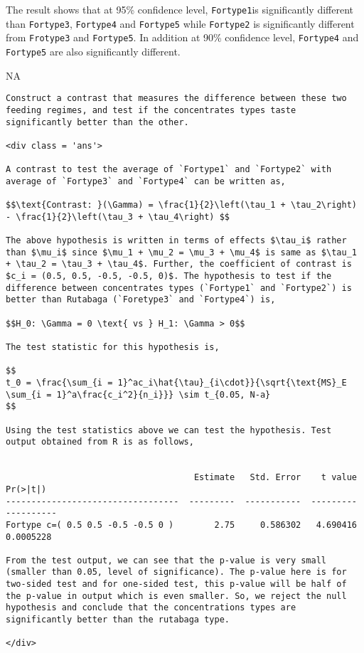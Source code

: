 \documentclass[11pt,a4paper]{article}
\begin{document}
\begin{enumerate}
  The result shows that at 95\% confidence level, \texttt{Fortype1}is
  significantly different than \texttt{Fortype3}, \texttt{Fortype4} and
  \texttt{Fortype5} while \texttt{Fortype2} is significantly different
  from \texttt{Frotype3} and \texttt{Fortype5}. In addition at 90\%
  confidence level, \texttt{Fortype4} and \texttt{Fortype5} are also
  significantly different.
\end{enumerate}

NA

\begin{verbatim}
Construct a contrast that measures the difference between these two feeding regimes, and test if the concentrates types taste significantly better than the other.

<div class = 'ans'>

A contrast to test the average of `Fortype1` and `Fortype2` with average of `Fortype3` and `Fortype4` can be written as,

$$\text{Contrast: }(\Gamma) = \frac{1}{2}\left(\tau_1 + \tau_2\right) - \frac{1}{2}\left(\tau_3 + \tau_4\right) $$

The above hypothesis is written in terms of effects $\tau_i$ rather than $\mu_i$ since $\mu_1 + \mu_2 = \mu_3 + \mu_4$ is same as $\tau_1 + \tau_2 = \tau_3 + \tau_4$. Further, the coefficient of contrast is $c_i = (0.5, 0.5, -0.5, -0.5, 0)$. The hypothesis to test if the difference between concentrates types (`Fortype1` and `Fortype2`) is better than Rutabaga (`Foretype3` and `Fortype4`) is,

$$H_0: \Gamma = 0 \text{ vs } H_1: \Gamma > 0$$

The test statistic for this hypothesis is,

$$
t_0 = \frac{\sum_{i = 1}^ac_i\hat{\tau}_{i\cdot}}{\sqrt{\text{MS}_E \sum_{i = 1}^a\frac{c_i^2}{n_i}}} \sim t_{0.05, N-a}
$$ 
    
Using the test statistics above we can test the hypothesis. Test output obtained from R is as follows,


                                     Estimate   Std. Error    t value    Pr(>|t|)
----------------------------------  ---------  -----------  ---------  ----------
Fortype c=( 0.5 0.5 -0.5 -0.5 0 )        2.75     0.586302   4.690416   0.0005228

From the test output, we can see that the p-value is very small (smaller than 0.05, level of significance). The p-value here is for two-sided test and for one-sided test, this p-value will be half of the p-value in output which is even smaller. So, we reject the null hypothesis and conclude that the concentrations types are significantly better than the rutabaga type.

</div>
\end{verbatim}
\end{document}
